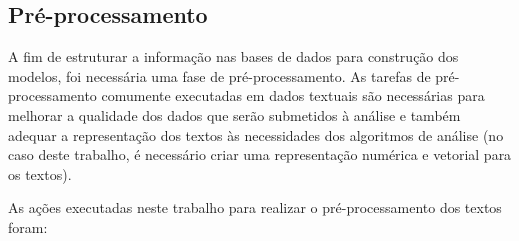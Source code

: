 \documentclass[
    12pt,                %
    oneside,            %
    a4paper,            %
    english,            %
    brazil                %
    ]{abntex2ppgsi}
\begin{document}
\subsection{Pré-processamento}
\label{subsec:preproc}

A fim de estruturar a informação nas bases de dados para construção dos modelos, foi necessária uma fase de pré-processamento.
As tarefas de pré-processamento comumente executadas em dados textuais são necessárias para melhorar a qualidade dos dados que serão submetidos à análise e também adequar a representação dos textos às necessidades dos algoritmos de análise (no caso deste trabalho, é necessário criar uma representação numérica e vetorial para os textos).

As ações executadas neste trabalho para realizar o pré-processamento dos textos foram:
\end{document}
